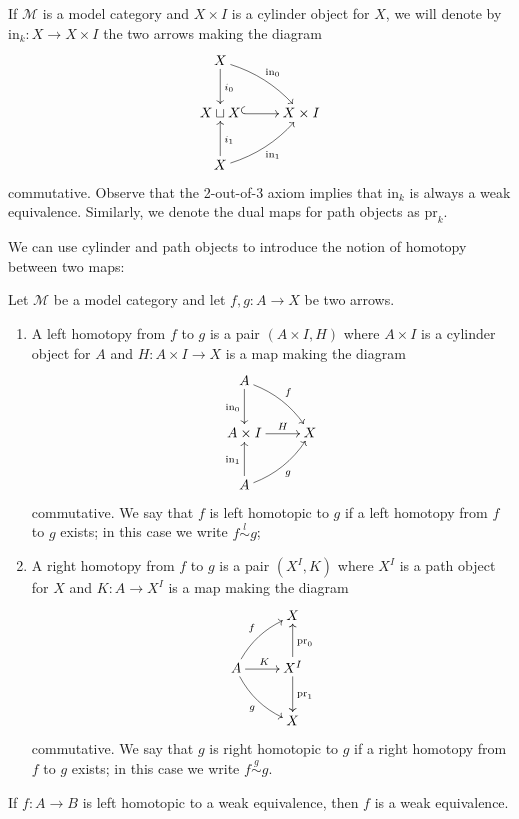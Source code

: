 \begin{notation}
If $\mathcal M$ is a model category and $X \times I$ is a cylinder object for $X$, we will denote by $\mathrm{in}_k \colon X \to X \times I$ the two arrows making the diagram
\[
\xymatrix{ X \ar[d]^{i_0} \ar@/^.5pc/[dr]^{\mathrm{in}_0} \\ X \sqcup X \ar@{^(->}[r] & X \times I \\ X \ar[u]_{i_1} \ar@/_.5pc/[ur]_{\mathrm{in}_1} }
\]
commutative. Observe that the 2-out-of-3 axiom implies that $\mathrm{in}_k$ is always a weak equivalence. Similarly, we denote the dual maps for path objects as $\mathrm{pr}_k$.
\end{notation}

We can use cylinder and path objects to introduce the notion of homotopy between two maps:

\begin{defin}
Let $\mathcal M$ be a model category and let $f,g \colon A \to X$ be two arrows.
\begin{enumerate}
\item A left homotopy from $f$ to $g$ is a pair $(A \times I, H)$ where $A \times I$ is a cylinder object for $A$ and $H \colon A \times I \to X$ is a map making the diagram
\[
\xymatrix{
A \ar[d]_{\mathrm{in}_0} \ar@/^.5pc/[dr]^f \\ A \times I \ar[r]^-H & X \\ A \ar[u]^{\mathrm{in}_1} \ar@/_.5pc/[ur]_g
}
\]
commutative. We say that $f$ is left homotopic to $g$ if a left homotopy from $f$ to $g$ exists; in this case we write $f \stackrel{l}{\sim} g$;

\item A right homotopy from $f$ to $g$ is a pair $(X^I, K)$ where $X^I$ is a path object for $X$ and $K \colon A \to X^I$ is a map making the diagram
\[
\xymatrix{
& X \\
A \ar@/^.5pc/[ur]^f \ar[r]^K \ar@/_.5pc/[dr]_g & X^I \ar[u]_{\mathrm{pr}_0} \ar[d]^{\mathrm{pr}_1} \\ & X
}
\]
commutative. We say that $g$ is right homotopic to $g$ if a right homotopy from $f$ to $g$ exists; in this case we write $f \stackrel{g}{\sim} g$.
\end{enumerate}
\end{defin}

\begin{lemma} \label{lemma homotopy category 0}
If $f \colon A \to B$ is left homotopic to a weak equivalence, then $f$ is a weak equivalence.
\end{lemma}

